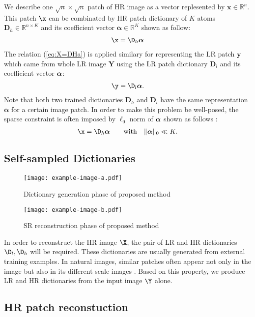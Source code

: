 \documentclass[10pt,english]{ikelab-sips}
\begin{document}
We describe one
$\sqrt{n}\times\sqrt{n}$
patch of HR image as a vector
replesented by $\bm{x}\in\mathbb{R}^{n}$.
This patch $\x$ can be combinated by
HR patch dictionary of $K$ atoms $\bm{D}_{h}\in\mathbb{R}^{n \times K}$
and its coefficient vector $\bm{\alpha} \in \mathbb{R}^{K}$
shown as follow: %
%
\begin{align}
 \x=\D_h\a\label{eq:X=DHa}
\end{align}
%
The relation (\ref{eq:X=DHa}) is applied similary
for representing the LR patch $\bm{y}$ which came from whole LR image $\bm{Y}$
using the LR patch dictionary $\bm{D}_{l}$ and its coefficient vector $\bm{\alpha}$:
%
\begin{align}
 \y=\D_l\a.
\end{align}
%
Note that both two trained dictionaries $\bm{D}_{h}$ and $\bm{D}_{l}$ have
the same representation $\bm{\alpha}$ for a certain image patch.
In order to make this problem be well-posed, the sparse constraint is often imposed
by $\ell_0$ norm of $\bm{\alpha}$ shown as follows \cite{Yang2008,Yang2010}:
%
\begin{align}
\x = \D_h\a\qquad\mathrm{with}\quad\|\a\|_0 \ll K.
\label{eq:X=DHa_sparse}
\end{align}
%

\subsection{Self-sampled Dictionaries}\label{sec:self-sampled}
%
\begin{figure}[t]
 \centering
 \texttt{[image: example-image-a.pdf]}
\caption{Dictionary generation phase of proposed method}
\label{fig:sd_dic}
\end{figure}

\begin{figure}[t]
 \centering
 \texttt{[image: example-image-b.pdf]}
\caption{SR reconstruction phase of proposed method}
\label{fig:sd_sr}
\end{figure}

In order to reconstruct the HR image $\X$, the pair of LR and HR dictionaries $\D_l, \D_h$ will be required.
These dictionaries are usually generated from external training examples.
In natural images, similar patches often appear not only in the
image but also in its different scale images \cite{Glasner2009}.
Based on this property, we produce LR and HR dictionaries from the input image $\Y$ alone.


\subsection{HR patch reconstuction}
\end{document}
